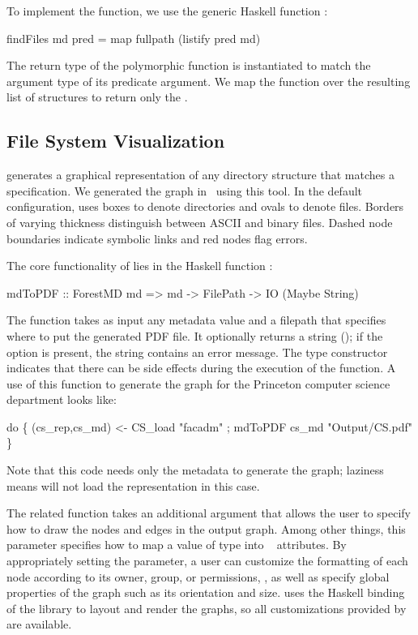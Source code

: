 To implement the  function, we use the generic Haskell
function : 
\begin{code}
findFiles md pred = map fullpath (listify pred md)
\end{code}
The return type of the polymorphic  function is
instantiated to match the argument type of its predicate argument. 
We map the  function over the resulting list of
 structures to return only the .

\subsection{File System Visualization}
\fg{} generates a graphical representation of any directory structure
that matches a \forest{} specification.  We generated the graph in~ using  
this tool.  In the default configuration, \fg{} uses boxes to denote
directories and ovals to denote files. Borders of varying
thickness distinguish between ASCII and binary files.  
Dashed node boundaries indicate symbolic links and red nodes flag errors.

The core functionality of \fg{} lies in the Haskell function :
\begin{code}
mdToPDF :: ForestMD md => 
     md -> FilePath -> IO (Maybe String)
\end{code}
The function takes as input any metadata value and a
filepath that specifies where to 
put the generated PDF file.  It optionally returns a string (); if the option is present, the string contains an error
message.  The  type constructor indicates that there can be
side effects during the execution of the function.  A use of
this function to generate the graph for the Princeton computer science
department \filestore{} looks like:
\begin{code}
 do \{ (cs_rep,cs_md) <- CS_load  "facadm"
    ; mdToPDF cs_md "Output/CS.pdf"       \}
\end{code}
Note that this code needs only the metadata to generate the graph;
laziness means \forest{} will not load the representation in this
case. 

The related function  takes an additional
argument that allows the user to specify how to draw the nodes and
edges in the output graph.  Among other things, this parameter
specifies how to map a value of type  into
\graphviz{}~\cite{haskell-graphviz,Gansner+:graphviz} attributes.  By appropriately setting the
parameter, a user can customize the formatting of each node according
to its owner, group, or permissions, \etc{}, as well as specify global
properties of the graph such as its orientation and size.  \fg{} uses
the Haskell binding of the \graphviz{} library to layout and render
the graphs, so all customizations provided by \graphviz{} are
available.

